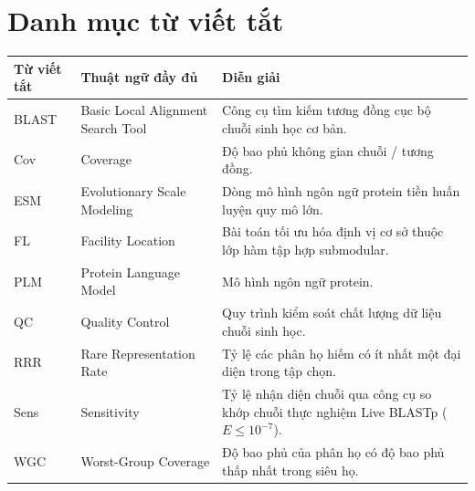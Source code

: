 \chapter*{Danh mục từ viết tắt}
{}

\begin{table}[H]
\centering
\begin{tabularx}{\textwidth}{L{2.0cm}L{6.2cm}Y}
\toprule
\textbf{Từ viết tắt} & \textbf{Thuật ngữ đầy đủ} & \textbf{Diễn giải} \\
\midrule
BLAST & Basic Local Alignment Search Tool & Công cụ tìm kiếm tương đồng cục bộ chuỗi sinh học cơ bản. \\
\addlinespace
Cov & Coverage & Độ bao phủ không gian chuỗi / tương đồng. \\
\addlinespace
ESM & Evolutionary Scale Modeling & Dòng mô hình ngôn ngữ protein tiền huấn luyện quy mô lớn. \\
\addlinespace
FL & Facility Location & Bài toán tối ưu hóa định vị cơ sở thuộc lớp hàm tập hợp submodular. \\
\addlinespace
PLM & Protein Language Model & Mô hình ngôn ngữ protein. \\
\addlinespace
QC & Quality Control & Quy trình kiểm soát chất lượng dữ liệu chuỗi sinh học. \\
\addlinespace
RRR & Rare Representation Rate & Tỷ lệ các phân họ hiếm có ít nhất một đại diện trong tập chọn. \\
\addlinespace
Sens & Sensitivity & Tỷ lệ nhận diện chuỗi qua công cụ so khớp chuỗi thực nghiệm Live BLASTp ($E \le 10^{-7}$). \\
\addlinespace
WGC & Worst-Group Coverage & Độ bao phủ của phân họ có độ bao phủ thấp nhất trong siêu họ. \\
\bottomrule
\end{tabularx}
\end{table}

\clearpage
